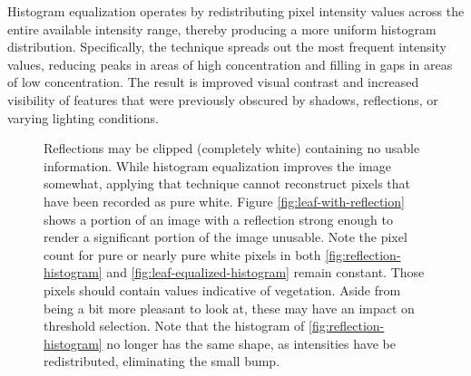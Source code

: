 \documentclass[letterpaper]{report}
\begin{document}
{Histogram equalization operates by redistributing pixel intensity values across the entire available intensity range, thereby producing a more uniform histogram distribution. Specifically, the technique spreads out the most frequent intensity values, reducing peaks in areas of high concentration and filling in gaps in areas of low concentration. The result is improved visual contrast and increased visibility of features that were previously obscured by shadows, reflections, or varying lighting conditions.


\begin{figure}[H]
	\centering
	\hfill
	\hfill
	\hfill
	\caption[Reflection problems in segmented vegetation]{Reflections may be clipped (completely white) containing no usable information. While histogram equalization improves the image somewhat, applying that technique cannot reconstruct pixels that have been recorded as pure white. Figure \ref{fig:leaf-with-reflection} shows a portion of an image with a reflection strong enough to render a significant portion of the image unusable. Note the pixel count for pure or nearly pure white pixels in both \ref{fig:reflection-histogram} and \ref{fig:leaf-equalized-histogram} remain constant.  Those pixels should contain values indicative of vegetation. Aside from being a bit more pleasant to look at, these may have an impact on threshold selection. Note that the histogram of \ref{fig:reflection-histogram} no longer has the same shape, as intensities have be redistributed, eliminating the small bump.}
	\label{fig:reflection}
\end{figure}

}
\end{document}
